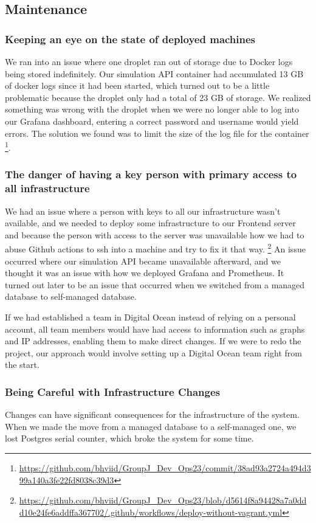 \subsection{Maintenance}

\subsubsection{Keeping an eye on the state of deployed machines}
We ran into an issue where one droplet ran out of storage due to Docker logs being stored indefinitely. Our simulation API container had accumulated 13 GB of docker logs since it had been started, which turned out to be a little problematic because the droplet only had a total of 23 GB of storage. We realized something was wrong with the droplet when we were no longer able to log into our Grafana dashboard, entering a correct password and username would yield errors.
The solution we found was to limit the size of the log file for the container 
\footnote{\url{https://github.com/bhviid/GroupJ_Dev_Ops23/commit/38ad93a2724a494d399a140a3fe22fd8038c39d3} }.

\subsubsection{The danger of having a key person with primary access to all infrastructure}
We had an issue where a person with keys to all our infrastructure wasn't available, and we needed to deploy some infrastructure to our Frontend server and because the person with access to the server was unavailable how we had to abuse Github actions to ssh into a machine and try to fix it that way. \footnote{\url{https://github.com/bhviid/GroupJ_Dev_Ops23/blob/d5614f8a94428a7a0ddd10e24fe6addffa367702/.github/workflows/deploy-without-vagrant.yml}}
An issue occurred where our simulation API became unavailable afterward, and we thought it was an issue with how we deployed Grafana and Prometheus. It turned out later to be an issue that occurred when we switched from a managed database to self-managed database.

If we had established a team in Digital Ocean instead of relying on a personal account, all team members would have had access to information such as graphs and IP addresses, enabling them to make direct changes. If we were to redo the project, our approach would involve setting up a Digital Ocean team right from the start.


\subsubsection{Being Careful with Infrastructure Changes}
Changes can have significant consequences for the infrastructure of the system. When we made the move from a managed database to a self-managed one, we lost Postgres serial counter, which broke the system for some time.

